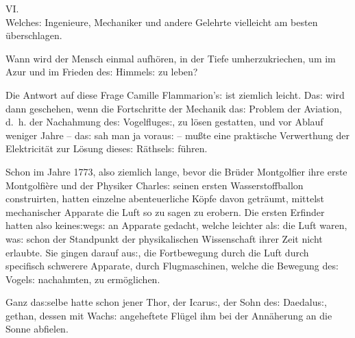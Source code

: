 \documentclass[oneside,12pt]{book}
\newenvironment{antiqua}{\normalfont}{}
\newcommand{\s}{s:}
\begin{document}
\newpage\begin{center}\label{kap06}
{\large \begin{antiqua}VI.\end{antiqua}\\
Welche{\s} Ingenieure, Mechaniker und andere Gelehrte vielleicht am
besten \"uberschlagen.\\\bigskip}
\end{center}



{\glqq}Wann wird der Mensch einmal aufh\"oren, in der Tiefe
umherzukriechen, um im Azur und im Frieden de{\s} Himmel{\s} zu
leben?{\grqq}

Die Antwort auf diese Frage Camille Flammarion'{\s} ist ziemlich
leicht. Da{\s} wird dann geschehen, wenn die Fortschritte der
Mechanik da{\s} Problem der Aviation, d.~h. der Nachahmung de{\s}
Vogelfluge{\s}, zu l\"osen gestatten, und vor Ablauf weniger Jahre --
da{\s} sah man ja vorau{\s} -- mu{\ss}te eine praktische Verwerthung
der Elektricit\"at zur L\"osung diese{\s} R\"athsel{\s} f\"uhren.

Schon im Jahre 1773, also ziemlich lange, bevor die Br\"uder
Montgolfier ihre erste Montgolfi\`ere und der Physiker Charle{\s}
seinen ersten Wasserstoffballon construirten, hatten einzelne
abenteuerliche K\"opfe davon getr\"aumt, mittelst mechanischer
Apparate die Luft so zu sagen zu erobern. Die ersten Erfinder hatten
also keine{\s}weg{\s} an Apparate gedacht, welche leichter al{\s} die
Luft waren, wa{\s} schon der Standpunkt der physikalischen
Wissenschaft ihrer Zeit nicht erlaubte. Sie gingen darauf au{\s}, die
Fortbewegung durch die Luft durch specifisch schwerere Apparate,
durch Flugmaschinen, welche die Bewegung de{\s} Vogel{\s} nachahmten,
zu erm\"oglichen.

Ganz da{\s}selbe hatte schon jener Thor, der Icaru{\s}, der Sohn
de{\s} Daedalu{\s}, gethan, dessen mit Wach{\s} angeheftete Fl\"ugel
ihm bei der Ann\"aherung an die Sonne abfielen.
\end{document}
